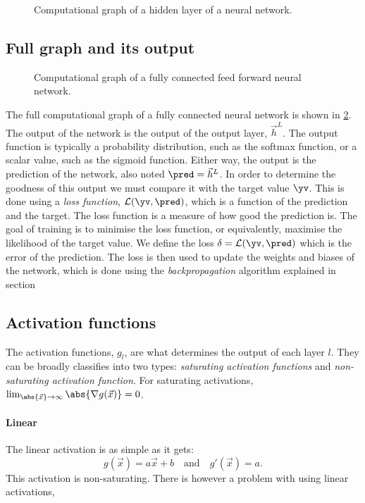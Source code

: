         \begin{figure}[h!]
            \centering
            
            \caption{Computational graph of a hidden layer of a neural network.}
            \label{fig:ML:NN:comp_graph_hl}
        \end{figure}

    \subsection{Full graph and its output}
        \begin{figure}[h!]
            \centering
            
            \caption{Computational graph of a fully connected feed forward neural network.}
            \label{fig:ML:NN:comp_graph_whole_FFNN}
        \end{figure}
        The full computational graph of a fully connected neural network is shown in \cref{fig:ML:NN:comp_graph_whole_FFNN}. The output of the network is the output of the output layer, $\vec{h}^L$. The output function is typically a probability distribution, such as the softmax function, or a scalar value, such as the sigmoid function. Either way, the output is the prediction of the network, also noted $\pred = \vec{h}^L$. In order to determine the goodness of this output we must compare it with the target value $\yv$. This is done using a \textit{loss function}, $\mathcal{L}(\yv, \pred)$, which is a function of the prediction and the target. The loss function is a measure of how good the prediction is. The goal of training is to minimise the loss function, or equivalently, maximise the likelihood of the target value. We define the loss $\delta=\mathcal{L}(\yv, \pred)$ which is the error of the prediction. The loss is then used to update the weights and biases of the network, which is done using the \textit{backpropagation} algorithm explained in section 


    \subsection{Activation functions}
        The activation functions, $g_l$, are what determines the output of each layer $l$. They can be broadly classifies into two types: \textit{saturating activation functions} and \textit{non-saturating activation function}. For saturating activations, $\lim_{\abs{\vec{x}}\to\infty}\abs{\nabla g(\vec{x})} = 0$. 
        \paragraph{Linear}
            The linear activation is as simple as it gets:
            \begin{equation}\label{eq:ML:NN:activation:linear}
                g(\vec{x}) = a\vec{x} + b \quad \mathrm{and} \quad g'(\vec{x}) = a.
            \end{equation}
            This activation is non-saturating. There is however a problem with using linear activations, 

